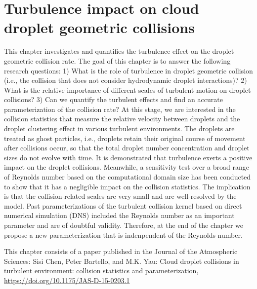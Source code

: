 \resetdatestamp

\chapter{Turbulence impact on cloud droplet geometric collisions} \label{sec:ch2}

This chapter investigates and quantifies the turbulence effect on the droplet geometric collision rate. The goal of this chapter is to answer the following research questions: 1) What is the role of turbulence in droplet geometric collision (i.e., the collision that does not consider hydrodynamic droplet interactions)?  2) What is the relative importance of different scales of turbulent motion on droplet collisions? 3) Can we quantify the turbulent effects and find an accurate parameterization of the collision rate? At this stage, we are interested in the collision statistics that measure the relative velocity between droplets and the droplet clustering effect in various turbulent environments. The droplets are treated as ghost particles, i.e., droplets retain their original course of movement after collisions occur, so that the total droplet number concentration and droplet sizes do not evolve with time. It is demonstrated that turbulence exerts a positive impact on the droplet collisions. Meanwhile, a sensitivity test over a broad range of Reynolds number based on the computational domain size has been conducted to show that it has a negligible impact on the collision statistics. The implication is that the collision-related scales are very small and are well-resolved by the model. Past parameterizations of the turbulent collision kernel based on direct numerical simulation (DNS) included the Reynolds number as an important parameter and are of doubtful validity. Therefore, at the end of the chapter we propose a new parameterization that is indenpendent of the Reynolds number. 

This chapter consists of a paper published in the Journal of the Atmospheric Sciences: Sisi Chen, Peter Bartello, and M.K. Yau: Cloud droplet collisions in turbulent environment: collision statistics and parameterization, \url{https://doi.org/10.1175/JAS-D-15-0203.1}
\newpage

